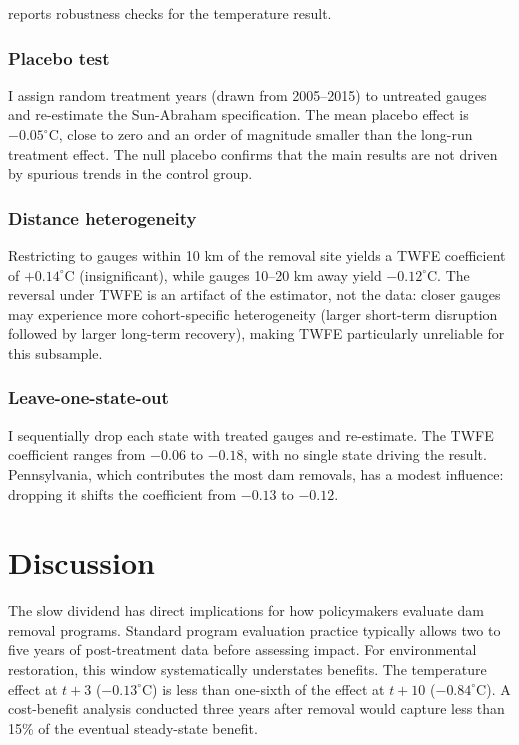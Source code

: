 \documentclass[12pt]{article}
\begin{document}
 reports robustness checks for the temperature result.

\subsubsection*{Placebo test} I assign random treatment years (drawn from 2005--2015) to untreated gauges and re-estimate the Sun-Abraham specification. The mean placebo effect is $-0.05^{\circ}$C, close to zero and an order of magnitude smaller than the long-run treatment effect. The null placebo confirms that the main results are not driven by spurious trends in the control group.

\subsubsection*{Distance heterogeneity} Restricting to gauges within 10 km of the removal site yields a TWFE coefficient of $+0.14^{\circ}$C (insignificant), while gauges 10--20 km away yield $-0.12^{\circ}$C. The reversal under TWFE is an artifact of the estimator, not the data: closer gauges may experience more cohort-specific heterogeneity (larger short-term disruption followed by larger long-term recovery), making TWFE particularly unreliable for this subsample.

\subsubsection*{Leave-one-state-out} I sequentially drop each state with treated gauges and re-estimate. The TWFE coefficient ranges from $-0.06$ to $-0.18$, with no single state driving the result. Pennsylvania, which contributes the most dam removals, has a modest influence: dropping it shifts the coefficient from $-0.13$ to $-0.12$.



\section{Discussion}

The slow dividend has direct implications for how policymakers evaluate dam removal programs. Standard program evaluation practice typically allows two to five years of post-treatment data before assessing impact. For environmental restoration, this window systematically understates benefits. The temperature effect at $t + 3$ ($-0.13^{\circ}$C) is less than one-sixth of the effect at $t + 10$ ($-0.84^{\circ}$C). A cost-benefit analysis conducted three years after removal would capture less than 15\% of the eventual steady-state benefit.
\end{document}
